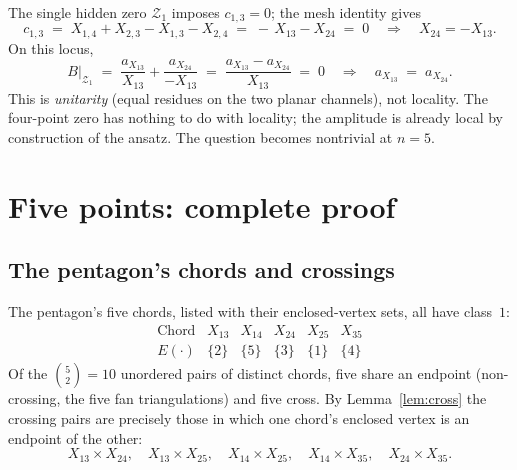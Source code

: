 \documentclass[11pt]{article}
\newcommand{\Zr}{\mathcal{Z}}
\begin{document}
The single hidden zero $\Zr_1$ imposes $c_{1,3} = 0$; the mesh identity
gives
\[
c_{1,3} \;=\; X_{1,4} + X_{2,3} - X_{1,3} - X_{2,4}
\;=\; -\,X_{13} - X_{24} \;=\; 0 \quad\Longrightarrow\quad X_{24} = -X_{13}.
\]
On this locus,
\[
B\big|_{\Zr_1}
\;=\; \frac{a_{X_{13}}}{X_{13}} + \frac{a_{X_{24}}}{-X_{13}}
\;=\; \frac{a_{X_{13}} - a_{X_{24}}}{X_{13}} \;=\; 0
\quad\Longrightarrow\quad
\boxed{a_{X_{13}} \;=\; a_{X_{24}}.}
\]
This is \emph{unitarity} (equal residues on the two planar channels),
not locality. The four-point zero has nothing to do with locality; the
amplitude is already local by construction of the ansatz. The question
becomes nontrivial at $n = 5$.

\begin{center}
\hspace{1.6cm}
\end{center}

\section{Five points: complete proof}

\subsection{The pentagon's chords and crossings}

The pentagon's five chords, listed with their enclosed-vertex sets, all
have class~$1$:
\[
\begin{array}{c|ccccc}
\text{Chord} & X_{13} & X_{14} & X_{24} & X_{25} & X_{35} \\ \hline
E(\cdot)     & \{2\}  & \{5\}  & \{3\}  & \{1\}  & \{4\}
\end{array}
\]
Of the $\binom{5}{2} = 10$ unordered pairs of distinct chords, five
share an endpoint (non-crossing, the five fan triangulations) and five
cross. By Lemma~\ref{lem:cross} the crossing pairs are precisely those
in which one chord's enclosed vertex is an endpoint of the other:
\[
X_{13}\!\times\!X_{24},\quad X_{13}\!\times\!X_{25},\quad
X_{14}\!\times\!X_{25},\quad X_{14}\!\times\!X_{35},\quad
X_{24}\!\times\!X_{35}.
\]
\end{document}
